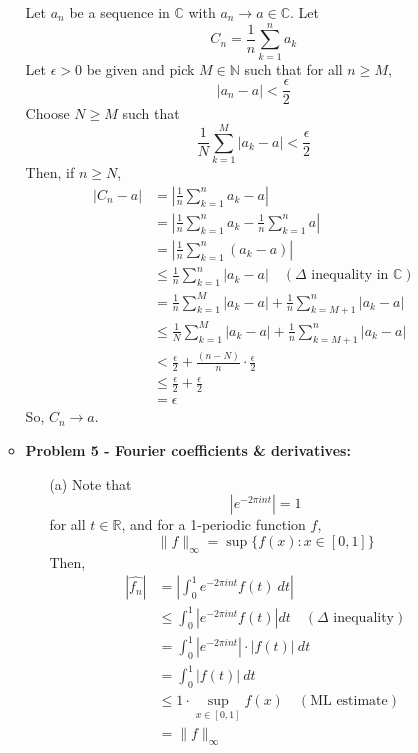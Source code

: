 \documentclass[12pt, reqno]{amsart}
\theoremstyle{definition}
\theoremstyle{remark}
\begin{document}
\begin{itemize}
\begin{itemize}
Let $a_{n}$ be a sequence in $\mathbb{C}$ with $a_{n}\rightarrow a\in \mathbb{C}$. Let $$C_{n}= \frac{1}{n}\sum_{k=1}^{n}a_{k}$$
Let $\epsilon>0$ be given and pick $M\in \mathbb{N}$ such that for all $n\ge M$, $$|a_{n}-a|< \frac{\epsilon}{2}$$
Choose $N\ge M$ such that $$\frac{1}{N}\sum_{k=1}^{M}|a_{k}-a|< \frac{\epsilon}{2}$$
Then, if $n\ge N$,
\begin{align*}|C_{n}-a|&= \left| \frac{1}{n}\sum_{k=1}^{n}a_{k}-a\right|\\
&= \left| \frac{1}{n}\sum_{k=1}^{n}a_{k}- \frac{1}{n}\sum_{k=1}^{n} a\right|\\
&= \left| \frac{1}{n}\sum_{k=1}^{n}(a_{k}-a)\right|\\
&\le \frac{1}{n}\sum_{k=1}^{n}\left|a_{k}-a\right|\quad (\Delta\text{ inequality in }\mathbb{C})\\
&= \frac{1}{n}\sum_{k=1}^{M}|a_{k}-a|+ \frac{1}{n}\sum_{k=M+1}^{n}\left|a_{k}-a\right|\\
&\le \frac{1}{N}\sum_{k=1}^{M}\left|a_{k}-a\right|+ \frac{1}{n}\sum_{k=M+1}^{n}\left|a_{k}-a\right|\\
&< \frac{\epsilon}{2}+ \frac{(n-N)}{n}\cdot \frac{\epsilon}{2}\\
&\le \frac{\epsilon}{2}+\frac{\epsilon}{2}\\
&= \epsilon
\end{align*}
So, $C_n\to a$.

\vspace{0.2 cm}
\item {\bf{Problem 5 - Fourier coefficients \& derivatives:}} 



\vspace{0.1 cm}
\begin{itemize}
\item[(a)] 
Note that $$
\left|e^{-2\pi int}\right|= 1
$$for all $t\in \mathbb{R}$, and for a 1-periodic function $f$, $$\|f\|_{\infty}=\sup\{f(x):x\in[0,1]\}$$
Then, 
\begin{align*}
|\hat{f_{n}}|&= \left|\int_{0}^{1}e^{-2\pi int}f(t)\ dt\right|\\
&\le \int_{0}^{1}\left| e^{-2\pi int}f(t)\right|dt\quad(\Delta \text{ inequality})\\
&= \int_{0}^{1}\left|e^{-2\pi int}\right|\cdot \left|f(t)\right|\ dt\\
&= \int_{0}^{1}|f(t)|\ dt\\
&\le 1\cdot\sup_{x\in[0,1]}f(x)\quad(\text{ML estimate})\\
	&= \|f\|_{\infty}
\\
\end{align*}


\end{itemize}
\end{itemize}
\end{itemize}
\end{document}
